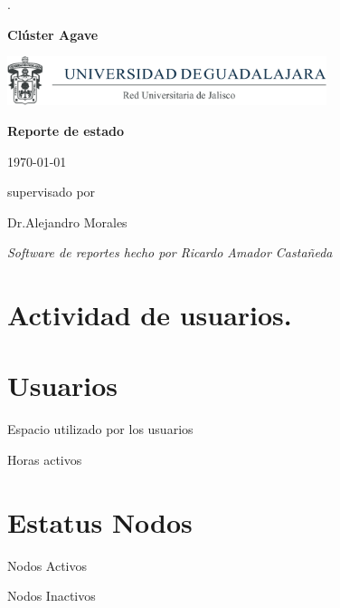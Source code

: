 \documentclass[11pt,a4paper,oneside,openany]{report}
\begin{document}
 \begin{titlepage}
	\centering
	{\scshape\tiny . \par}
	{\huge\bf Clúster Agave \par}
	\vspace{1cm}
	\includegraphics[width=0.7\textwidth]{udg.png}\par
	\vspace{2.7cm}
	{\Huge\bfseries Reporte de estado \par}
	\vspace{2cm}
	{\huge \today \par}
	\vfill
	supervisado por\par
	Dr.Alejandro Morales
	\vfill
	{\Large\itshape Software de reportes hecho por Ricardo Amador Castañeda\par}
		
 \end{titlepage}

\section{Actividad de usuarios.}


\resizebox{14cm}{!}{}

\section{Usuarios}
	{\huge Espacio  utilizado  por los usuarios}
  	
    {\huge Horas  activos}
    


\section{Estatus Nodos}

	{\huge Nodos Activos}
	
	{\huge Nodos Inactivos}
	
	  
\end{document}
